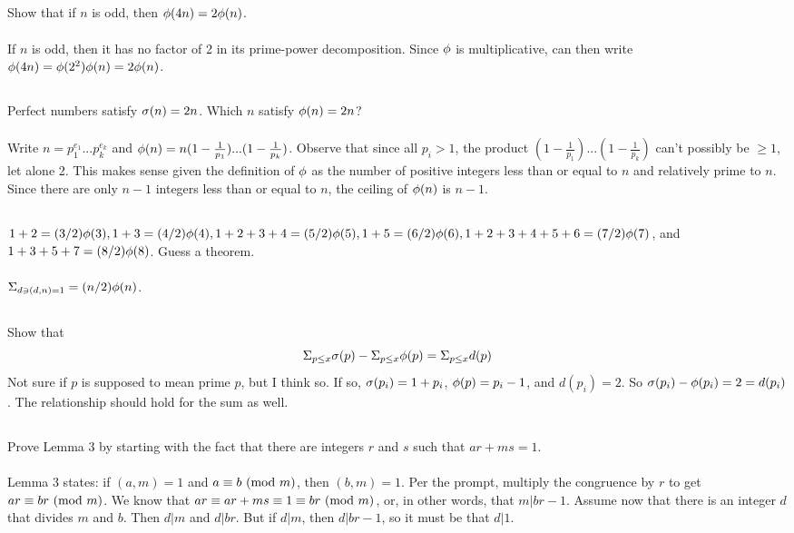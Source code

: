 \documentclass{article}
\begin{document}
\subsection{}
Show that if $n$ is odd, then $\phi(4n) = 2\phi(n)$.\\~\\
If $n$ is odd, then it has no factor of 2 in its prime-power decomposition.
Since $\phi$ is multiplicative, can then write $\phi(4n) = \phi(2^2)\phi(n) = 2\phi(n)$.

\subsection{}
Perfect numbers satisfy $\sigma(n) = 2n$. Which $n$ satisfy $\phi(n) = 2n$?\\~\\
Write $n = p_1^{e_1}...p_k^{e_k}$
and $\phi(n) = n(1 - \frac{1}{p_1})...(1 - \frac{1}{p_k})$.
Observe that since all $p_i > 1$, the product
$(1 - \frac{1}{p_1})...(1 - \frac{1}{p_k})$ can't possibly be $\geq 1$,
let alone 2.
This makes sense given the definition of $\phi$ as the number of positive integers
less than or equal to $n$ and relatively prime to $n$.
Since there are only $n - 1$ integers less than or equal to $n$,
the ceiling of $\phi(n)$ is $n - 1$.

\subsection{}
$1 + 2 = (3/2)\phi(3), 1 + 3 = (4/2)\phi(4), 1 + 2 + 3 + 4 = (5/2)\phi(5),
1 + 5 = (6/2)\phi(6), 1 + 2 + 3 + 4 + 5 + 6 = (7/2)\phi(7)$, and
$1 + 3 + 5 + 7 = (8/2)\phi(8)$. Guess a theorem.\\~\\
$\Sigma_{d \ni (d, n) = 1} = (n/2)\phi(n)$.

\subsection{}
Show that
\begin{equation*}
    \Sigma_{p \leq x} \sigma(p) - \Sigma_{p \leq x} \phi(p) = \Sigma_{p \leq x} d(p)
\end{equation*}
Not sure if $p$ is supposed to mean prime $p$, but I think so.
If so, $\sigma(p_i) = 1 + p_i$, $\phi(p) = p_i - 1$, and $d(p_i) = 2$.
So $\sigma(p_i) - \phi(p_i) = 2 = d(p_i)$.
The relationship should hold for the sum as well.

\subsection{}
Prove Lemma 3 by starting with the fact that there are integers $r$ and
$s$ such that $ar + ms = 1$.\\~\\
Lemma 3 states: if $(a, m) = 1$ and $a \equiv b \ (\mathrm{mod}\ m)$, then $(b, m) = 1$.
Per the prompt, multiply the congruence by $r$ to get $ar \equiv br \ (\mathrm{mod}\ m)$.
We know that $ar \equiv ar + ms \equiv 1 \equiv br \ (\mathrm{mod}\ m)$,
or, in other words, that $m|br - 1$.
Assume now that there is an integer $d$ that divides $m$ and $b$.
Then $d|m$ and $d|br$.
But if $d|m$, then $d|br - 1$, so it must be that $d|1$.
\end{document}
